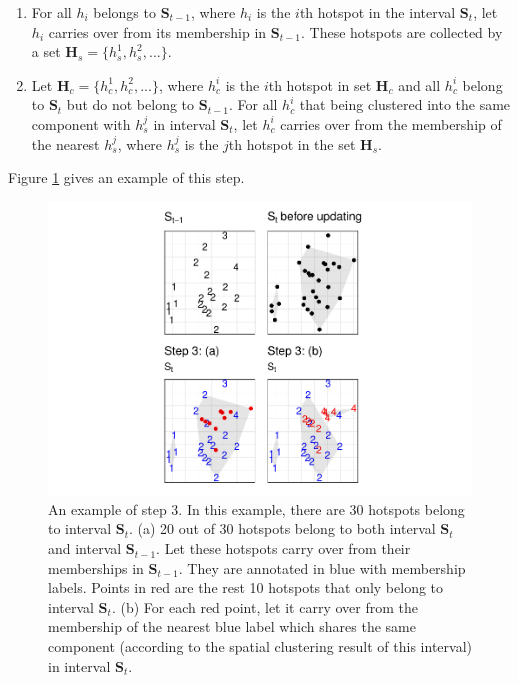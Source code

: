 \begin{enumerate}
\def\labelenumi{(\alph{enumi})}
\item
  For all \(h_i\) belongs to \(\boldsymbol{S}_{t-1}\), where \(h_i\) is
  the \(i\)th hotspot in the interval \(\boldsymbol{S}_{t}\), let
  \(h_i\) carries over from its membership in \(\boldsymbol{S}_{t-1}\).
  These hotspots are collected by a set
  \(\boldsymbol{H}_s = \{h_s^1,h_s^2,...\}\).
\item
  Let \(\boldsymbol{H}_c = \{h_c^1,h_c^2,...\}\), where \(h_c^i\) is the
  \(i\)th hotspot in set \(\boldsymbol{H}_c\) and all \(h_c^i\) belong
  to \(\boldsymbol{S}_t\) but do not belong to \(\boldsymbol{S}_{t-1}\).
  For all \(h_c^i\) that being clustered into the same component with
  \(h_s^j\) in interval \(\boldsymbol{S}_t\), let \(h_c^i\) carries over
  from the membership of the nearest \(h_s^j\), where \(h_s^j\) is the
  \(j\)th hotspot in the set \(\boldsymbol{H}_s\).
\end{enumerate}

Figure \ref{fig:step3figs} gives an example of this step.

\begin{Schunk}
\begin{figure}

{\centering \includegraphics[width=0.8\linewidth]{clustering_paper_files/figure-latex/step3figs-1} 

}

\caption{An example of step 3. In this example, there are 30 hotspots belong to interval $\boldsymbol{S}_t$. (a) 20 out of 30 hotspots belong to both interval $\boldsymbol{S}_t$ and interval $\boldsymbol{S}_{t-1}$. Let these hotspots carry over from their memberships in $\boldsymbol{S}_{t-1}$. They are annotated in blue with membership labels. Points in red are the rest 10 hotspots that only belong to interval $\boldsymbol{S}_t$. (b) For each red point, let it carry over from the membership of the nearest blue label which shares the same component (according to the spatial clustering result of this interval) in interval $\boldsymbol{S}_t$. }\label{fig:step3figs}
\end{figure}
\end{Schunk}


